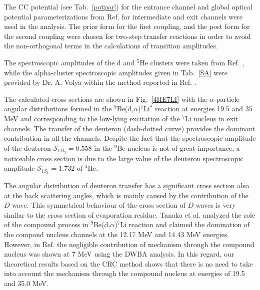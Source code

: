 \documentclass[10pt]{iopart}
\begin{document}
The CC potential (see Tab.~\ref{potpar}) for the entrance channel and global optical potential parameterizations from Ref. \cite{globalTriton, globalAlpha, global6Li} for intermediate and exit channels were used in the analysis.
The prior form for the first coupling, and the post form for the second coupling were chosen for two-step transfer reactions in order to avoid the non-orthogonal terms in the calculations of transition amplitudes.


The spectroscopic amplitudes of the d and ${}^5$He clusters were taken from Ref. \cite{fiveSA}, while the alpha-cluster spectroscopic amplitudes given in Tab.~\ref{SA} were provided by Dr. A. Volya within the method reported in Ref. \cite{volya2017}.

The calculated cross sections are shown in Fig.~\ref{4HE7LI} with the $\alpha$-particle angular distributions formed in the ${}^9$Be(d,$\alpha$)${}^7$Li$^*$ reaction at energies 19.5 and 35 MeV and corresponding to the low-lying excitation of the ${}^7$Li nucleus in exit channels. The transfer of the deuteron (dash-dotted curve) provides the dominant contribution in all the channels. Despite the fact that the spectroscopic amplitude of the deuteron $\mathcal{S}_{1{D}_3}=0.558$ in the $^9$Be nucleus is not of great importance, a noticeable cross section is due to the large value of the deuteron spectroscopic amplitude $\mathcal{S}_{1{S}_1}=1.732$  of ${}^4$He.

The angular distribution of deuteron transfer has a significant cross section also at the back scattering angles, which is mainly caused by the contribution of the $D$ wave. This symmetrical behaviour of the cross section of $D$ waves is very similar to the cross section of evaporation residue. Tanaka et al. \cite{tanaka1978} analyzed the role of the compound process in ${}^9$Be(d,$\alpha$)${}^7$Li reaction and claimed the domination of the compond nucleus channels at the 12.17 MeV and 14.43 MeV energies. However, in Ref. \cite{bodek1989} the negligible contribution of mechanism through the compound nucleus was shown at 7 MeV using the DWBA analysis. In this regard, our theoretical results based on the CRC method shows that there is no need to take into account the mechanism through the compound nucleus at energies of 19.5 and 35.0 MeV.
\end{document}
